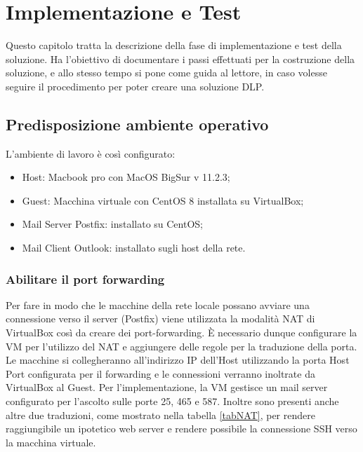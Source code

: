 \chapter{Implementazione e Test}

Questo capitolo tratta la descrizione della fase di implementazione e test della soluzione.
Ha l'obiettivo di documentare i passi effettuati per la costruzione della soluzione, e allo stesso tempo
si pone come guida al lettore, in caso volesse seguire il procedimento per poter creare una soluzione DLP.
\section{Predisposizione ambiente operativo}

L'ambiente di lavoro è così configurato:

\begin{itemize}
    \item Host: Macbook pro con MacOS BigSur v 11.2.3;
    \item Guest: Macchina virtuale con CentOS 8 installata su VirtualBox;
    \item Mail Server Postfix: installato su CentOS;
    \item Mail Client Outlook: installato sugli host della rete.
\end{itemize}

\subsection{Abilitare il port forwarding}
Per fare in modo che le macchine della rete locale possano avviare una connessione
verso il server (Postfix) viene utilizzata la modalità NAT di VirtualBox così da creare dei 
port-forwarding. È necessario dunque configurare la VM per l'utilizzo del NAT e aggiungere delle regole
per la traduzione della porta.
Le macchine si collegheranno all'indirizzo IP dell'Host utilizzando la porta Host Port configurata
per il forwarding e le connessioni verranno inoltrate da VirtualBox al Guest.
Per l'implementazione, la VM gestisce un mail server configurato per l'ascolto sulle porte 25, 465 e
587. Inoltre sono presenti anche altre due traduzioni, come mostrato nella tabella \ref{tabNAT}, per rendere raggiungibile un ipotetico web server e rendere possibile
la connessione SSH verso la macchina virtuale.

